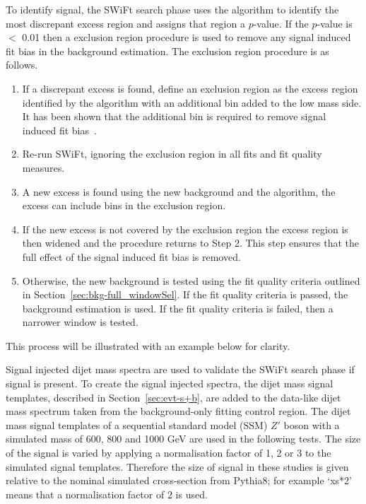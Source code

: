 To identify signal, the SWiFt search phase uses the \bh{} algorithm to identify the most discrepant excess region and assigns that region a \mbox{$p$-value}.
If the \mbox{$p$-value} is $<$ 0.01 then a exclusion region procedure is used to remove any signal induced fit bias in the background estimation.
The exclusion region procedure is as follows.
\begin{enumerate}[leftmargin=*]
\item If a discrepant excess is found, define an exclusion region as the excess
  region identified by the \bh{} algorithm with an additional \mjj{} bin added to the low mass side.
  It has been shown that the additional bin is required to remove signal induced fit bias~\cite{dijet-mori16_paper}.
\item Re-run SWiFt, ignoring the exclusion region in all fits and fit quality measures.
\item A new excess is found using the new background and the \bh{} algorithm,
  the excess can include bins in the exclusion region.
\item If the new excess is not covered by the exclusion region the excess region is then widened and the procedure returns to Step 2.
  This step ensures that the full effect of the signal induced fit bias is removed.
\item Otherwise, the new background is tested using the fit quality criteria outlined in Section~\ref{sec:bkg-full_windowSel}.
  If the fit quality criteria is passed, the background estimation is used.
  If the fit quality criteria is failed, then a narrower window is tested.
\end{enumerate}
This process will be illustrated with an example below for clarity.

Signal injected dijet mass spectra are used to validate the SWiFt search phase if signal is present.
To create the signal injected spectra, the dijet mass signal templates, described in Section~\ref{sec:evt-s+b},
are added to the data-like dijet mass spectrum taken from the background-only fitting control region.
The dijet mass signal templates of a sequential standard model (SSM) $Z'$ boson with a simulated mass of 600, 800 and 1000 GeV are used in the following tests.
The size of the signal is varied by applying a normalisation factor of 1, 2 or 3 to the simulated signal templates.
Therefore the size of signal in these studies is given relative to the nominal simulated cross-section from { \sc Pythia8};
for example `xs*2' means that a normalisation factor of 2 is used.

